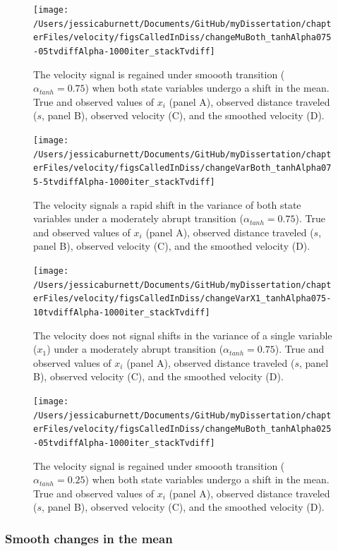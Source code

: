 \documentclass[12pt,twoside,openany]{reedthesis}
\begin{document}
\newpage
\begin{figure}[bth]

{\centering \texttt{[image: /Users/jessicaburnett/Documents/GitHub/myDissertation/chapterFiles/velocity/figsCalledInDiss/changeMuBoth\_tanhAlpha075-05tvdiffAlpha-1000iter\_stackTvdiff]} 

}

\caption{The velocity signal is regained under smoooth transition ($\alpha_{tanh}=0.75$) when both state variables undergo a shift in the mean. True and observed values of $x_i$ (panel A), observed distance traveled ($s$, panel B), observed velocity (C), and the smoothed velocity (D). }\label{fig:muBoth75}
\end{figure}
\newpage
\begin{figure}[bth]

{\centering \texttt{[image: /Users/jessicaburnett/Documents/GitHub/myDissertation/chapterFiles/velocity/figsCalledInDiss/changeVarBoth\_tanhAlpha075-5tvdiffAlpha-1000iter\_stackTvdiff]} 

}

\caption{The velocity signals a rapid shift in the variance of both state variables under a moderately abrupt transition ($\alpha_{tanh}=0.75$). True and observed values of $x_i$ (panel A), observed distance traveled ($s$, panel B), observed velocity (C), and the smoothed velocity (D). }\label{fig:varBoth}
\end{figure}
\newpage
\begin{figure}[bth]

{\centering \texttt{[image: /Users/jessicaburnett/Documents/GitHub/myDissertation/chapterFiles/velocity/figsCalledInDiss/changeVarX1\_tanhAlpha075-10tvdiffAlpha-1000iter\_stackTvdiff]} 

}

\caption{The velocity does not signal shifts in the variance of a single variable ($x_1$) under a moderately abrupt transition ($\alpha_{tanh}=0.75$). True and observed values of $x_i$ (panel A), observed distance traveled ($s$, panel B), observed velocity (C), and the smoothed velocity (D). }\label{fig:var1}
\end{figure}
\newpage
\begin{figure}[bth]

{\centering \texttt{[image: /Users/jessicaburnett/Documents/GitHub/myDissertation/chapterFiles/velocity/figsCalledInDiss/changeMuBoth\_tanhAlpha025-05tvdiffAlpha-1000iter\_stackTvdiff]} 

}

\caption{The velocity signal is regained under smoooth transition ($\alpha_{tanh}=0.25$) when both state variables undergo a shift in the mean. True and observed values of $x_i$ (panel A), observed distance traveled ($s$, panel B), observed velocity (C), and the smoothed velocity (D). }\label{fig:muBoth25}
\end{figure}
\hypertarget{smooth-changes-in-the-mean}{%
\subsubsection{Smooth changes in the mean}\label{smooth-changes-in-the-mean}}
\end{document}
